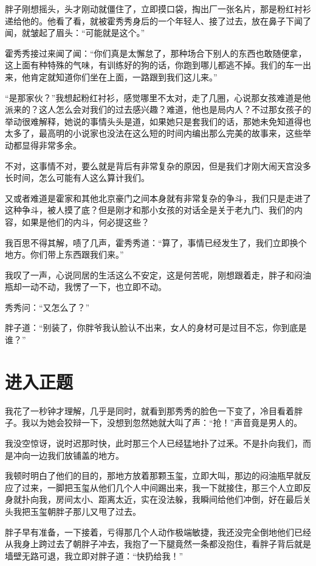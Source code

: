 胖子刚想摇头，头才刚动就僵住了，立即摸口袋，掏出厂一张名片，那是粉红衬衫递给他的。他看了看，就被霍秀秀身后的一个年轻人、接了过去，放在鼻子下闻了闻，就皱起了眉头：“可能就是这个。”

霍秀秀接过来闻了闻：“你们真是太懈怠了，那种场合下别人的东西也敢随便拿，这上面有种特殊的气味，有训练好的狗的话，你跑到哪儿都逃不掉。我们的车一出来，他肯定就知道你们坐在上面，一路跟到我们这儿来。”

“是那家伙？”我想起粉红衬衫，感觉哪里不太对，走了几圈，心说那女孩难道是他派来的？这人怎么会对我们的过去感兴趣？难道，他也是局内人？不过那女孩子的举动很难解释，她说的事情头头是道，如果她只是套我们的话，那她未免知道得也太多了，最高明的小说家也没法在这么短的时间内编出那么完美的故事来，这些举动都显得非常多余。

不对，这事情不对，要么就是背后有非常复杂的原因，但是我们才刚大闹天宫没多长时间，怎么可能有人这么算计我们。

又或者难道是霍家和其他北京豪门之间本身就有非常复杂的争斗，我们只是走进了这种争斗，被人摸了底？但是刚才和那小女孩的对话全是关于老九门、我们的内容，如果是他们的内斗，何必提这些？

我百思不得其解，啧了几声，霍秀秀道：“算了，事情已经发生了，我们立即换个地方。你们带上东西跟我们来。”

我叹了一声，心说同居的生活这么不安定，这是何苦呢，刚想跟着走，胖子和闷油瓶却一动不动，我愣了一下，也立即不动。

秀秀问：“又怎么了？”

胖子道：“别装了，你胖爷我认脸认不出来，女人的身材可是过目不忘，你到底是谁？”

\chapter{进入正题}

我花了一秒钟才理解，几乎是同时，就看到那秀秀的脸色一下变了，冷目看着胖子。我以为她会狡辩一下，没想到忽然她就大叫了声：“抢！”声音竟是男人的。

我没空惊讶，说时迟那时快，此时那三个人已经猛地扑了过釆。不是扑向我们，而是冲向一边我们放铺盖的地方。

我顿时明白了他们的目的，那地方放着那颗玉玺，立即大叫，那边的闷油瓶早就反应了过来，一脚把玉玺从他们几个人中间踢出来，我一下就接住，那三个人立即反身就扑向我，房间太小、距离太近，实在没法躲，我瞬间给他们冲倒，好在最后关头我把玉玺朝胖子那儿又甩了过去。

胖子早有准备，一下接着，亏得那几个人动作极端敏捷，我还没完全倒地他们已经从我身上跨过去了朝胖子冲去，我抱了一下腿竟然一条都没抱住，看胖子背后就是墙壁无路可退，我立即对胖子道：“快扔给我！”

